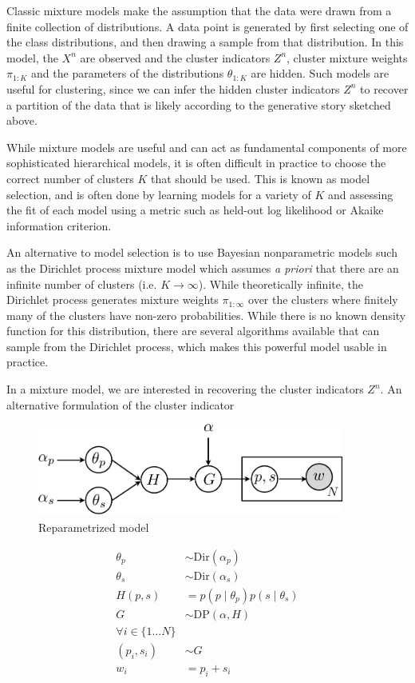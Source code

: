 Classic mixture models make the assumption that the data were drawn
from a finite collection of distributions. A data point is generated
by first selecting one of the class distributions, and then drawing a
sample from that distribution. In this model, the $X^n$ are observed
and the cluster indicators $Z^n$, cluster mixture weights $\pi_{1:K}$
and the parameters of the distributions $\theta_{1:K}$ are
hidden. Such models are useful for clustering, since we can infer the
hidden cluster indicators $Z^n$ to recover a partition of the data
that is likely according to the generative story sketched above.

While mixture models are useful and can act as fundamental components
of more sophisticated hierarchical models, it is often difficult in
practice to choose the correct number of clusters $K$ that should be
used. This is known as model selection, and is often done by learning
models for a variety of $K$ and assessing the fit of each model using
a metric such as held-out log likelihood or Akaike information
criterion.

An alternative to model selection is to use Bayesian nonparametric
models such as the Dirichlet process mixture model \cite{antoniak1974}
which assumes \textit{a priori} that there are an infinite number of
clusters (i.e. $K \to \infty$). While theoretically infinite, the
Dirichlet process generates mixture weights $\pi_{1:\infty}$ over the
clusters where finitely many of the clusters have non-zero
probabilities. While there is no known density function for this
distribution, there are several algorithms available that can sample
from the Dirichlet process, which makes this powerful model usable in
practice.

In a mixture model, we are interested in recovering the cluster
indicators $Z^n$. An alternative formulation of the cluster indicator

\begin{figure}[h]
\centering
\includegraphics[width=0.9\textwidth]{fig/v2}
\caption{Reparametrized model}
\label{fig:v1}
\end{figure}

\begin{align*}
\theta_p & \sim \text{Dir}(\alpha_p) \\
\theta_s & \sim \text{Dir}(\alpha_s) \\
H(p, s) & = p(p \mid \theta_p) p(s \mid \theta_s) \\
G & \sim \text{DP}\left(\alpha, H\right)\\
\forall i \in \{1 \dots N\} \\
(p_i, s_i) & \sim G \\
w_i & = p_i+s_i
\end{align*}
